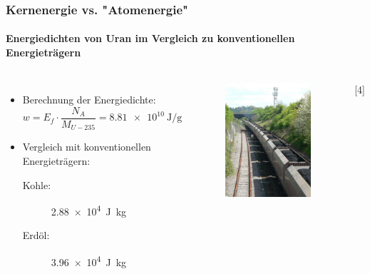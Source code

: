 \documentclass{beamer}[9pt]
\begin{document}
\begin{frame}
\frametitle{Kernenergie vs. "Atomenergie"}
\framesubtitle{Energiedichten von Uran im Vergleich zu konventionellen Energieträgern}
\begin{columns}
\begin{itemize}
\item Berechnung der Energiedichte:
\[
w = E_f \cdot \frac{ N_A }{M_{U-235}} = \SI{8.81e10}{\joule\per\gram}
\]
\item Vergleich mit konventionellen Energieträgern:\\
\begin{description}
\item[ Kohle:] \SI{2.88e4}{\joule\kg}
\item[Erdöl:] \SI{3.96e4}{\joule\kg}

\end{description}
\end{itemize}
\begin{figure}[htp]
\includegraphics[scale=.15]{coal.jpg}
\end{figure}
\hspace{.5\columnwidth}[4]
\end{columns}
\end{frame}
\end{document}
